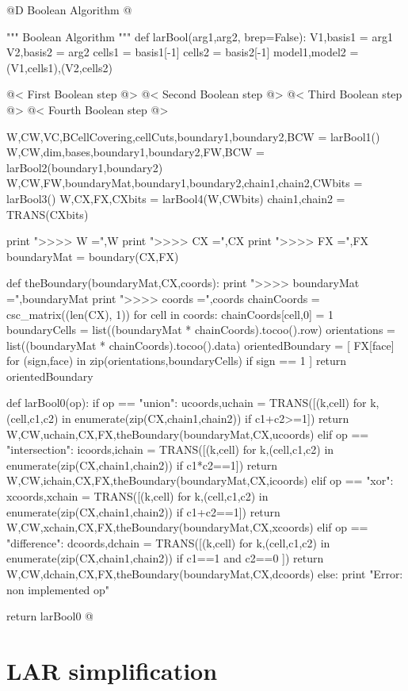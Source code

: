 \documentclass[11pt,oneside]{article}	%
\begin{document}
@D Boolean Algorithm
@{""" Boolean Algorithm """
def larBool(arg1,arg2, brep=False):
	V1,basis1 = arg1
	V2,basis2 = arg2
	cells1 = basis1[-1]
	cells2 = basis2[-1]
	model1,model2 = (V1,cells1),(V2,cells2)
	
	@< First Boolean step @>
	@< Second Boolean step @>
	@< Third Boolean step @>
	@< Fourth Boolean step @>
		
	W,CW,VC,BCellCovering,cellCuts,boundary1,boundary2,BCW = larBool1()
	W,CW,dim,bases,boundary1,boundary2,FW,BCW = larBool2(boundary1,boundary2)
	W,CW,FW,boundaryMat,boundary1,boundary2,chain1,chain2,CWbits = larBool3()
	W,CX,FX,CXbits = larBool4(W,CWbits)
	chain1,chain2 = TRANS(CXbits)
	
	print "\n>>>> W =",W
	print "\n>>>> CX =",CX
	print "\n>>>> FX =",FX
	boundaryMat = boundary(CX,FX)

	def theBoundary(boundaryMat,CX,coords):
		print "\n>>>> boundaryMat =",boundaryMat
		print "\n>>>> coords =",coords
		chainCoords = csc_matrix((len(CX), 1))
		for cell in coords: chainCoords[cell,0] = 1
		boundaryCells = list((boundaryMat * chainCoords).tocoo().row)
		orientations = list((boundaryMat * chainCoords).tocoo().data)
		orientedBoundary = [ FX[face] for (sign,face) in zip(orientations,boundaryCells)  if sign == 1 ]
		return orientedBoundary


	def larBool0(op):	
		if op == "union": 
			ucoords,uchain = TRANS([(k,cell) for k,(cell,c1,c2) in enumerate(zip(CX,chain1,chain2)) if c1+c2>=1])
			return W,CW,uchain,CX,FX,theBoundary(boundaryMat,CX,ucoords)
		elif op == "intersection": 
			icoords,ichain = TRANS([(k,cell) for k,(cell,c1,c2) in enumerate(zip(CX,chain1,chain2)) if c1*c2==1])
			return W,CW,ichain,CX,FX,theBoundary(boundaryMat,CX,icoords)
		elif op == "xor": 
			xcoords,xchain = TRANS([(k,cell) for k,(cell,c1,c2) in enumerate(zip(CX,chain1,chain2)) if c1+c2==1])
			return W,CW,xchain,CX,FX,theBoundary(boundaryMat,CX,xcoords)
		elif op == "difference": 
			dcoords,dchain = TRANS([(k,cell) for k,(cell,c1,c2) in enumerate(zip(CX,chain1,chain2)) if c1==1 and c2==0 ])
			return W,CW,dchain,CX,FX,theBoundary(boundaryMat,CX,dcoords)
		else: print "Error: non implemented op"

	return larBool0
@}


\section{LAR simplification}
\end{document}
